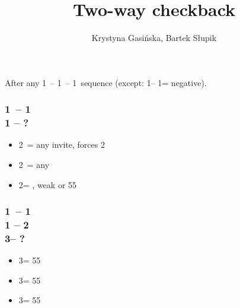 \documentclass[12pt, a4paper]{article}
\title{Two-way checkback}
\author{Krystyna Gasińska, Bartek Słupik}
\begin{document}
\maketitle


After any 1\ -- 1\ -- 1\ sequence (except:
1\clubs -- 1\diams = negative).

\subsubsection*{1\ -- 1 \\ 1 -- ?}
\begin{itemize}
    \item 2\clubs\ = any invite, forces 2\diams
    \item 2\diams\ = any \gf
    \item 2\nt = \clubs, weak or 55
\end{itemize}

\subsubsection*{1\ -- 1 \\ 
                1 -- 2\nt\\
                3\clubs -- ?}
\begin{itemize}
    \item 3\diams = 55\diams
    \item 3\hearts = 55\hearts
    \item 3\spades = 55\clubs
\end{itemize}

\end{document}
